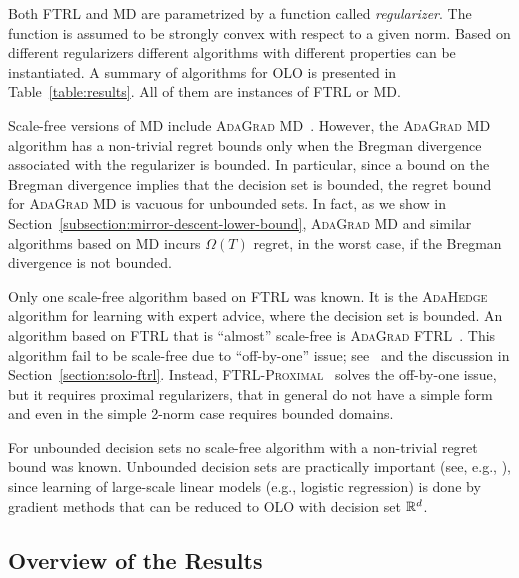 Both \textsc{FTRL} and \textsc{MD} are parametrized by a function called
\emph{regularizer}. The function is assumed to be strongly convex with respect
to a given norm. Based on different regularizers different algorithms with
different properties can be instantiated. A summary of algorithms for OLO is
presented in Table~\ref{table:results}.  All of them are instances of
\textsc{FTRL} or \textsc{MD}.

Scale-free versions of \textsc{MD} include \textsc{AdaGrad
MD}~\cite{Duchi-Hazan-Singer-2011}. However, the \textsc{AdaGrad MD} algorithm
has a non-trivial regret bounds only when the Bregman divergence associated with
the regularizer is bounded. In particular, since a bound on the Bregman
divergence implies that the decision set is bounded, the regret bound for
\textsc{AdaGrad MD} is vacuous for unbounded sets. In fact, as we show in
Section~\ref{subsection:mirror-descent-lower-bound}, \textsc{AdaGrad MD} and
similar algorithms based on \textsc{MD} incurs $\Omega(T)$ regret, in the worst
case, if the Bregman divergence is not bounded.

Only one scale-free algorithm based on \textsc{FTRL} was known. It is the
\textsc{AdaHedge}~\cite{de-Rooij-van-Erven-Grunwald-Koolen-2014} algorithm for
learning with expert advice, where the decision set is bounded. An algorithm
based on \textsc{FTRL} that is ``almost'' scale-free is \textsc{AdaGrad
FTRL}~\cite{Duchi-Hazan-Singer-2011}.  This algorithm fail to be scale-free due
to ``off-by-one'' issue; see~\cite{McMahan-2014} and the discussion in
Section~\ref{section:solo-ftrl}. Instead,
\textsc{FTRL-Proximal}~\cite{McMahan-Streeter-2010,McMahan-2014} solves the
off-by-one issue, but it requires proximal regularizers, that in general do not
have a simple form and even in the simple 2-norm case requires bounded domains.

For unbounded decision sets no scale-free algorithm with a non-trivial regret
bound was known. Unbounded decision sets are practically important (see, e.g.,
\cite{Mcmahan-Holt-Sculley-2013}), since learning of large-scale linear models
(e.g., logistic regression) is done by gradient methods that can be reduced to
OLO with decision set $\mathbb{R}^d$.

\subsection{Overview of the Results}

